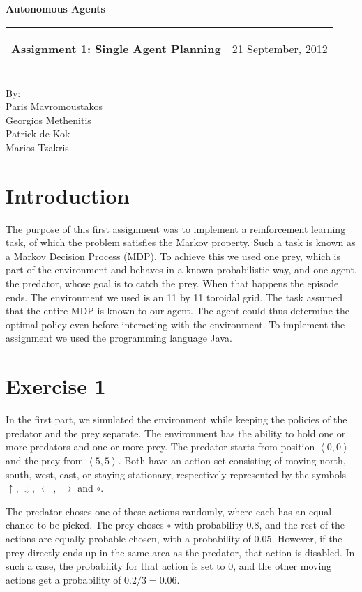 \documentclass[a4paper,11pt]{article}
\makeatletter
\newcommand{\resheading}[1]{{\large \colorbox{mygrey}{\begin{minipage}{\textwidth}{\textbf{#1 \vphantom{p\^{E}}}}\end{minipage}}}}
\newcommand{\mywebheader}{
  \begin{tabular}{@{}p{5in}p{4in}}
  {\resheading{Assignment 1: Single Agent Planning}} & {\Large 21 September, 2012}\\\vspace{0.2cm}
  \end{tabular}}
\makeatother
\begin{document}
\begin{center}
{\LARGE \textbf{Autonomous Agents}}\\ [1em]
\end{center}
\mywebheader

\begin{center}
{\Large By:} \\ \vspace{0.1cm}
{\Large Paris Mavromoustakos} \\  \vspace{0.1cm}
{\Large Georgios Methenitis} \\ \vspace{0.1cm}
{\Large Patrick de Kok} \\ \vspace{0.1cm}
{\Large Marios Tzakris}
\end{center}




\section*{Introduction}
The purpose of this first assignment was to implement a reinforcement learning task, of which the problem satisfies the Markov property.  Such a task is known as a Markov Decision Process (MDP).  To achieve this we used one prey, which is part of the environment and behaves in a known probabilistic way, and one agent, the predator, whose goal is to catch the prey.  When that happens the episode ends.  The environment we used is an 11 by 11 toroidal grid.  The task assumed that the entire MDP is known to our agent.  The agent could thus determine the optimal policy even before interacting with the environment.  To implement the assignment we used the programming language Java.

\section*{Exercise 1}
In the first part, we simulated the environment while keeping the policies of the predator and the prey separate.  The environment has the ability to hold one or more predators and one or more prey.  The predator starts from position $\left<0,0\right>$ and the prey from $\left<5,5\right>$.  Both have an action set consisting of moving north, south, west, east, or staying stationary, respectively represented by the symbols $\uparrow$, $\downarrow$, $\leftarrow$, $\rightarrow$ and $\circ$. 

The predator choses one of these actions randomly, where each has an equal chance to be picked.  The prey choses $\circ$ with probability $0.8$, and the rest of the actions are equally probable chosen, with a probability of $0.05$.  However, if the prey directly ends up in the same area as the predator, that action is disabled.  In such a case, the probability for that action is set to $0$, and the other moving actions get a probability of $0.2 / 3 = 0.0\bar{6}$.
\end{document}
